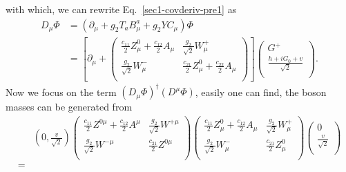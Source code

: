 \documentclass[11pt,a4paper,APS]{revtex4}
\begin{document}
		with which, we can rewrite Eq.~\eqref{sec1-covderiv-pre1} as 
		\begin{align}\nonumber 
			D_\mu \Phi&= (\partial_\mu + g_2 T_a B^a_\mu + g_2 YC_\mu) \Phi \\
			\label{sec1-covderiv-pre2}
			& =\left[\partial_\mu + \left(\begin{array}{cc}
			\frac{c_{11}}{2} Z_\mu^0 + \frac{c_{12}}{2} A_\mu&\frac{g_2}{\sqrt{2}}W_\mu^+ \\
			\frac{g_2}{\sqrt{2}}W_\mu^- & \frac{c_{21}}{2}Z_\mu^0+\frac{c_{22}}{2}A_\mu\\
			\end{array}\right)\right]\left(\begin{array}{c}
			G^+ \\
			\frac{h+iG_0 + v}{\sqrt{2}} \\ 
			\end{array}\right).
		\end{align}
		Now we focus on the term $(D_\mu\Phi)^\dag(D^\mu \Phi)$, easily one can find, the 
		boson masses can be generated from 
		\begin{equation}
		\begin{aligned}
			&\left(0,\frac{v}{\sqrt{2}}\right)\left(\begin{array}{cc}
			\frac{c_{11}}{2} Z^{0\mu} + \frac{c_{12}}{2} A^\mu&\frac{g_2}{\sqrt{2}}W^{+\mu} \\
			\frac{g_2}{\sqrt{2}}W^{-\mu} & \frac{c_{21}}{2}Z^{0\mu}\\
			\end{array}\right)
			\left(\begin{array}{cc}
			\frac{c_{11}}{2} Z_\mu^0 + \frac{c_{12}}{2} A_\mu&\frac{g_2}{\sqrt{2}}W_\mu^+ \\
			\frac{g_2}{\sqrt{2}}W_\mu^- & \frac{c_{21}}{2}Z_\mu^0\\
			\end{array}\right)
			\left(\begin{array}{c}
			0\\
			\frac{v}{\sqrt{2}} \\ 
			\end{array}\right) \\
			=& 
		\end{aligned}
		\end{equation}  
\end{document}
